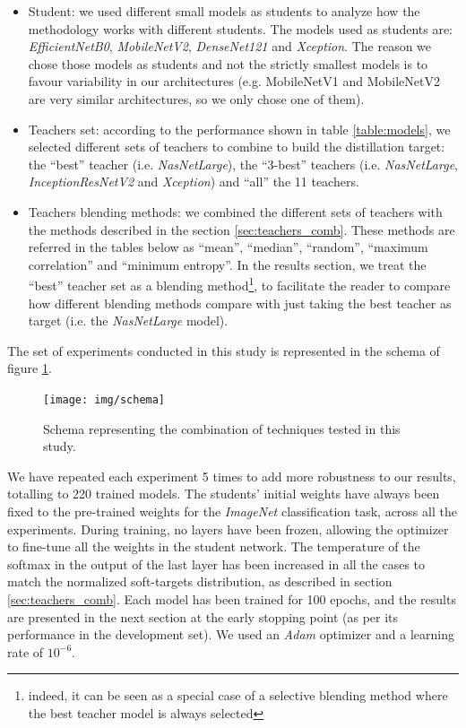 \documentclass{elsarticle}
\begin{document}
	\begin{itemize}
		\item Student: we used different small models as students to analyze how the methodology works with different students. The models used as students are: \textit{EfficientNetB0}, \textit{MobileNetV2}, \textit{DenseNet121} and \textit{Xception}. The reason we chose those models as students and not the strictly smallest models is to favour variability in our architectures (e.g. MobileNetV1 and MobileNetV2 are very similar architectures, so we only chose one of them).
		\item Teachers set: according to the performance shown in table \ref{table:models}, we selected different sets of teachers to combine to build the distillation target: the ``best'' teacher (i.e. \textit{NasNetLarge}), the ``3-best'' teachers (i.e. \textit{NasNetLarge}, \textit{InceptionResNetV2} and \textit{Xception}) and ``all'' the 11 teachers.
		\item Teachers blending methods: we combined the different sets of teachers with the methods described in the section \ref{sec:teachers_comb}. These methods are referred in the tables below as ``mean'', ``median'', ``random'', ``maximum correlation'' and ``minimum entropy''. In the results section, we treat the ``best'' teacher set as a blending method\footnote{indeed, it can be seen as a special case of a selective blending method where the best teacher model is always selected}, to facilitate the reader to compare how different blending methods compare with just taking the best teacher as target (i.e. the \textit{NasNetLarge} model). 
	\end{itemize}

	The set of experiments conducted in this study is represented in the schema of figure \ref{fig:schema}.

\begin{figure}[h!]
	\centering
	\texttt{[image: img/schema]}
	\caption{Schema representing the combination of techniques tested in this study.}
	\label{fig:schema}
\end{figure}


	We have repeated each experiment 5 times to add more robustness to our results, totalling to 220 trained models. The students' initial weights have always been fixed to the pre-trained weights for the \textit{ImageNet} classification task, across all the experiments. During training, no layers have been frozen, allowing the optimizer to fine-tune all the weights in the student network. The temperature of the softmax in the output of the last layer has been increased in all the cases to match the normalized soft-targets distribution, as described in section \ref{sec:teachers_comb}.  Each model has been trained for 100 epochs, and the results are presented in the next section at the early stopping point (as per its performance in the development set). We used an \textit{Adam} optimizer \citep{Kingma14} and a learning rate of $10^{-6}$.
\end{document}
